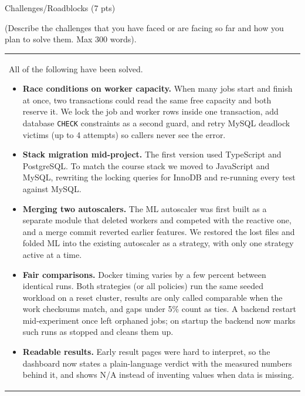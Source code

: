 \documentclass[12pt,a4paper]{article}
\newcommand{\sectiontitle}[1]{%
    {\color{GEUBlue}
    \fontsize{18}{22}\selectfont #1}
}
\newcommand{\instruction}[1]{%
    {\color{InstructionGrey}
    \fontsize{10.5}{13}\selectfont #1}
}
\newcommand{\answerbox}[2]{%
    \noindent
    \begin{tabularx}{\textwidth}{
        |>{\raggedright\arraybackslash}X|}
        \hline
        \parbox[t]{\dimexpr\linewidth-12pt\relax}{
            \vspace{5pt}
            \fontsize{10.5}{13}\selectfont #2
            \par\vspace{6pt}
        }\\
        \hline
    \end{tabularx}
}
\begin{document}
\vspace{0.65cm}

\sectiontitle{Challenges/Roadblocks (7 pts)}

\vspace{0.05cm}
\instruction{(Describe the challenges that you have faced or are facing so far
and how you plan to solve them. Max 300 words).}

\vspace{0.18cm}
\answerbox{4.05cm}{%
All of the following have been solved.
\begin{itemize}
    \item \textbf{Race conditions on worker capacity.} When many jobs start and finish at once, two
    transactions could read the same free capacity and both reserve it. We lock the job and worker rows
    inside one transaction, add database \texttt{CHECK} constraints as a second guard, and retry MySQL
    deadlock victims (up to 4 attempts) so callers never see the error.
    \item \textbf{Stack migration mid-project.} The first version used TypeScript and PostgreSQL. To match
    the course stack we moved to JavaScript and MySQL, rewriting the locking queries for InnoDB and
    re-running every test against MySQL.
    \item \textbf{Merging two autoscalers.} The ML autoscaler was first built as a separate module that
    deleted workers and competed with the reactive one, and a merge commit reverted earlier features.
    We restored the lost files and folded ML into the existing autoscaler as a strategy, with only one
    strategy active at a time.
    \item \textbf{Fair comparisons.} Docker timing varies by a few percent between identical runs. Both
    strategies (or all policies) run the same seeded workload on a reset cluster, results are only
    called comparable when the work checksums match, and gaps under 5\% count as ties. A backend restart
    mid-experiment once left orphaned jobs; on startup the backend now marks such runs as stopped and
    cleans them up.
    \item \textbf{Readable results.} Early result pages were hard to interpret, so the dashboard now
    states a plain-language verdict with the measured numbers behind it, and shows N/A instead of
    inventing values when data is missing.
\end{itemize}}

\newpage

\vspace*{0.30cm}
\end{document}
